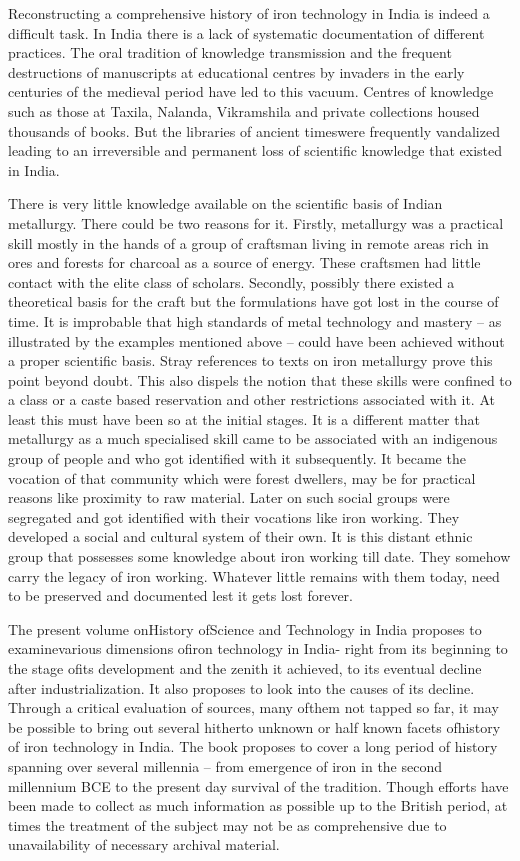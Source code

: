 Reconstructing a comprehensive history of iron technology in India is indeed a difficult task. In India there is a lack of systematic documentation of different practices. The oral tradition of knowledge transmission and the frequent destructions of manuscripts at educational centres by invaders in the early centuries of the medieval period have led to this vacuum. Centres of knowledge such as those at Taxila, Nalanda, Vikramshila and private collections housed thousands of books. But the libraries of ancient timeswere frequently vandalized leading to an irreversible and permanent loss of scientific knowledge that existed in India.

There is very little knowledge available on the scientific basis of Indian metallurgy. There could be two reasons for it. Firstly, metallurgy was a practical skill mostly in the hands of a group of craftsman living in remote areas rich in ores and forests for charcoal as a source of energy. These craftsmen had little contact with the elite class of scholars. Secondly, possibly there existed a theoretical basis for the craft but the formulations have got lost in the course of time. It is improbable that high standards of metal technology and mastery – as illustrated by the examples mentioned above – could have been achieved without a proper scientific basis. Stray references to texts on iron metallurgy prove this point beyond doubt. This also dispels the notion that these skills were confined to a class or a caste based reservation and other restrictions associated with it. At least this must have been so at the initial stages. It is a different matter that metallurgy as a much specialised skill came to be associated with an indigenous group of people and who got identified with it subsequently. It became the vocation of that community which were forest dwellers, may be for practical reasons like proximity to raw material. Later on such social groups were segregated and got identified with their vocations like iron working. They developed a social and cultural system of their own. It is this distant ethnic group that possesses some knowledge about iron working till date. They somehow carry the legacy of iron working. Whatever little remains with them today, need to be preserved and documented lest it gets lost forever.

The present volume onHistory ofScience and Technology in India proposes to examinevarious dimensions ofiron technology in India- right from its beginning to the stage ofits development and the zenith it achieved, to its eventual decline after industrialization. It also proposes to look into the causes of its decline. Through a critical evaluation of sources, many ofthem not tapped so far, it may be possible to bring out several hitherto unknown or half known facets ofhistory of iron technology in India. The book proposes to cover a long period of history spanning over several millennia – from emergence of iron in the second millennium BCE to the present day survival of the tradition. Though efforts have been made to collect as much information as possible up to the British period, at times the treatment of the subject may not be as comprehensive due to unavailability of necessary archival material.

